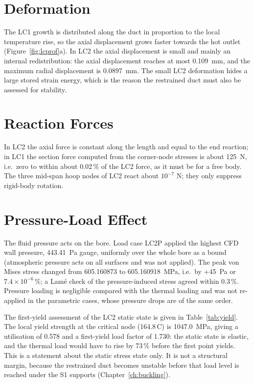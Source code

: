 \section{Deformation}
The LC1 growth is distributed along the duct in proportion to the local temperature rise, so the axial displacement grows faster towards the
hot outlet (Figure~\ref{fig:lcprof}a). In LC2 the axial displacement is small and mainly an internal redistribution: the axial displacement reaches
at most 0.109~mm, and the maximum radial displacement is 0.0897~mm. The small LC2 deformation hides a large stored strain energy, which is
the reason the restrained duct must also be assessed for stability.

\section{Reaction Forces}
In LC2 the axial force is constant along the length and equal to the end
reaction; in LC1 the section force computed from the corner-node stresses is about 125~N, i.e.\ zero to within about 0.02\,\% of the LC2 force, as it must be for a free body. The three
mid-span hoop nodes of LC2 react about $10^{-7}$ N; they only suppress rigid-body rotation.


\section{Pressure-Load Effect}
The fluid pressure acts on the bore. Load case LC2P applied the highest CFD wall pressure, 443.41~Pa gauge, uniformly over the whole bore as
a bound (atmospheric pressure acts on all surfaces and was not applied). The peak von Mises stress changed from 605.160873 to 605.160918~MPa,
i.e.\ by +45~Pa or $7.4\times10^{-6}$\,\%; a Lam\'e check of the pressure-induced stress agreed within 0.3\,\%.
Pressure loading is negligible compared with the thermal loading and was not re-applied in the parametric cases, whose pressure drops are
of the same order.


The first-yield assessment of the LC2 static state is given in Table~\ref{tab:yield}. The local yield strength at the critical node
(164.8\,\textdegree C) is 1047.0~MPa, giving a utilisation of 0.578 and a first-yield load factor of 1.730: the static state is elastic, and the
thermal load would have to rise by 73\,\% before the first point yields. This is a statement about the static stress state only. It is not a
structural margin, because the restrained duct becomes unstable before that load level is reached under the S1 supports
(Chapter~\ref{ch:buckling}).


